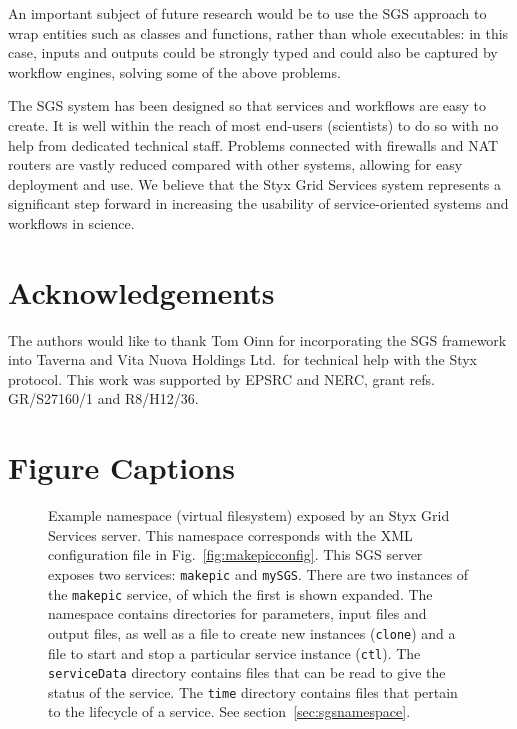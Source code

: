 \documentclass[a4paper]{article}
\begin{document}
An important subject of future research would be to use the SGS approach to wrap entities such as classes and functions, rather than whole executables: in this case, inputs and outputs could be strongly typed and could also be captured by workflow engines, solving some of the above problems.

The SGS system has been designed so that services and workflows are easy to create.  It is well within the reach of most end-users (scientists) to do so with no help from dedicated technical staff.  Problems connected with firewalls and NAT routers are vastly reduced compared with other systems, allowing for easy deployment and use.  We believe that the Styx Grid Services system represents a significant step forward in increasing the usability of service-oriented systems and workflows in science.
%

\section*{Acknowledgements}
The authors would like to thank Tom Oinn for incorporating the SGS framework into Taverna and Vita Nuova Holdings Ltd.\ for technical help with the Styx protocol.  This work was supported by EPSRC and NERC, grant refs. GR/S27160/1 and R8/H12/36.

%
%


\newpage
\singlespace

\section*{Figure Captions}

\begin{figure}[h]
\caption{Example namespace (virtual filesystem) exposed by an Styx Grid Services server.  This namespace corresponds with the XML configuration file in Fig.~\ref{fig:makepicconfig}.  This SGS server exposes two services: \texttt{makepic} and \texttt{mySGS}.  There are two instances of the \texttt{makepic} service, of which the first is shown expanded.  The namespace contains directories for parameters, input files and output files, as well as a file to create new instances (\texttt{clone}) and a file to start and stop a particular service instance (\texttt{ctl}).  The \texttt{serviceData} directory contains files that can be read to give the status of the service.  The \texttt{time} directory contains files that pertain to the lifecycle of a service.  See section~\ref{sec:sgsnamespace}.}\label{fig:sgsnamespace}
\end{figure}
\end{document}
